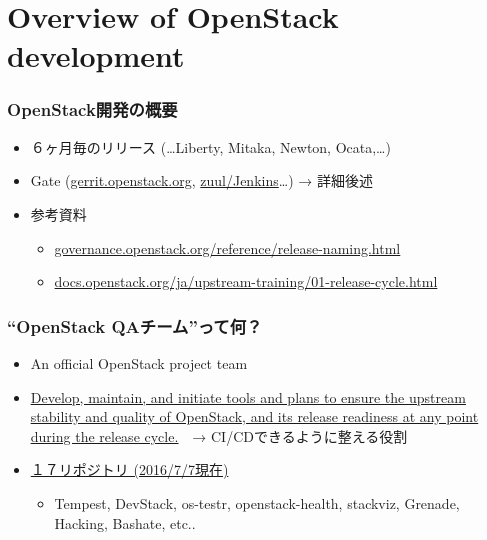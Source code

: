 \documentclass[aspectratio=169,11pt,hyperref={colorlinks=true}]{beamer}
\begin{document}
\section{Overview of OpenStack development}
\begin{frame}
  \frametitle{OpenStack開発の概要}
  \begin{itemize}
    \item ６ヶ月毎のリリース (\ldots Liberty, Mitaka, Newton, Ocata,\ldots)
    \item Gate (\href{https://gerrit.openstack.org}{gerrit.openstack.org},
      \href{http://zuul.openstack.org/}{zuul/Jenkins}\ldots) → 詳細後述
    \item 参考資料
      \begin{itemize}
        \item \href{http://governance.openstack.org/reference/release-naming.html}{governance.openstack.org/reference/release-naming.html}
        \item \href{http://docs.openstack.org/ja/upstream-training/01-release-cycle.html}{docs.openstack.org/ja/upstream-training/01-release-cycle.html}
      \end{itemize}
  \end{itemize}
\end{frame}

\begin{frame}
  \frametitle{``OpenStack QAチーム''って何？}
  \begin{itemize}
    \item An official OpenStack project team
    \item \href{https://wiki.openstack.org/wiki/QA}{\ul{Develop, maintain,
      and initiate tools and plans to ensure the upstream stability
      and quality of OpenStack, and its release readiness at any point
      during the release cycle.}}　→ CI/CDできるように整える役割
    \item \href{http://governance.openstack.org/reference/projects/quality-assurance.html}{１７リポジトリ (2016/7/7現在)}
    \begin{itemize}
      \item Tempest, DevStack, os-testr, openstack-health, stackviz, Grenade, Hacking, Bashate, etc..
    \end{itemize}
  \end{itemize}
\end{frame}
\end{document}

